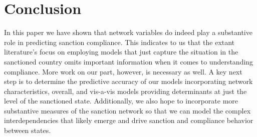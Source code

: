 \section*{Conclusion}
\label{conclusion}

In this paper we have shown that network variables do indeed play a substantive role in predicting sanction compliance. This indicates to us that the extant literature's focus on employing models that just capture the situation in the sanctioned country omits important information when it comes to understanding compliance. More work on our part, however, is necessary as well. A key next step is to determine the predictive accuracy of our models incorporating network characteristics, overall, and vis-a-vis models providing determinants at just the level of the sanctioned state. Additionally, we also hope to incorporate more substantive measures of the sanction network so that we can model the complex interdependencies that likely emerge and drive sanction and compliance behavior between states. 